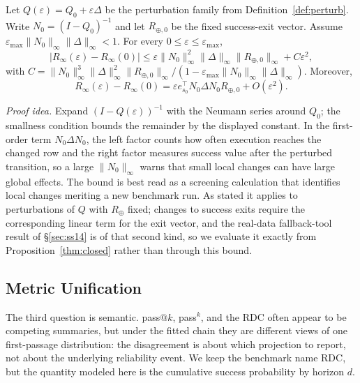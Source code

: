 \begin{proposition}
\label{thm:perturb}
Let $Q(\varepsilon)=Q_0+\varepsilon\Delta$ be the perturbation family
from Definition~\ref{def:perturb}. Write
$N_0=(I-Q_0)^{-1}$ and let $R_{\oplus,0}$ be the fixed success-exit
vector. Assume
$\varepsilon_{\max}\|N_0\|_\infty\|\Delta\|_\infty<1$.
For every $0\le\varepsilon\le\varepsilon_{\max}$,
\begin{equation}
\bigl|R_\infty(\varepsilon)-R_\infty(0)\bigr|
\le
\varepsilon \|N_0\|_\infty^2\|\Delta\|_\infty
        \|R_{\oplus,0}\|_\infty
 + C\varepsilon^2,
\label{eq:t2}
\end{equation}
with
$C=\|N_0\|_\infty^3\|\Delta\|_\infty^2\|R_{\oplus,0}\|_\infty
 /(1-\varepsilon_{\max}\|N_0\|_\infty\|\Delta\|_\infty)$. Moreover,
\begin{equation}
R_\infty(\varepsilon)-R_\infty(0)
=\varepsilon e_{s_0}^{\top}N_0\Delta N_0R_{\oplus,0}
 + O(\varepsilon^2).
\label{eq:t2lin}
\end{equation}
\end{proposition}

\noindent\emph{Proof idea.}
Expand $(I-Q(\varepsilon))^{-1}$ with the Neumann series around $Q_0$;
the smallness condition bounds the remainder by the displayed constant.
In the first-order term $N_0\Delta N_0$, the left factor counts how
often execution reaches the changed row and the right factor measures
success value after the perturbed transition, so a large
$\|N_0\|_\infty$ warns that small local changes can have large global
effects. The bound is best read as a screening calculation that
identifies local changes meriting a new benchmark run. As stated it
applies to perturbations of $Q$ with $R_\oplus$ fixed; changes to
success exits require the corresponding linear term for the exit
vector, and the real-data fallback-tool result of \S\ref{sec:ss14} is
of that second kind, so we evaluate it exactly from
Proposition~\ref{thm:closed} rather than through this bound.

\subsection{Metric Unification}
\label{sec:unify}

The third question is semantic. pass$@k$, pass$^k$, and the RDC often
appear to be competing summaries, but under the fitted chain they are
different views of one first-passage distribution: the disagreement is
about which projection to report, not about the underlying reliability
event. We keep the benchmark name RDC, but the quantity modeled here is
the cumulative success probability by horizon $d$.

